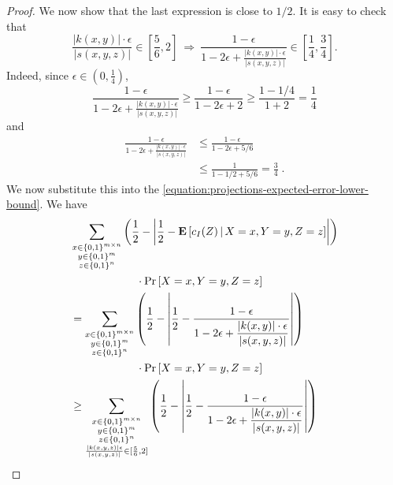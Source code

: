 \begin{proof}
We now show that the last expression is close to $1/2$. It is easy to check that
$$
\frac{|k(x,y)| \cdot \epsilon}{|s(x,y,z)|} \in \left[\frac{5}{6}, 2 \right] \ \Rightarrow \ \frac{\displaystyle 1 - \epsilon}{\displaystyle 1 - 2\epsilon + \frac{|k(x,y)| \cdot \epsilon}{|s(x,y,z)|}} \in \left[ \frac{1}{4}, \frac{3}{4} \right].
$$
Indeed, since $\epsilon \in (0,\frac{1}{4})$,
$$
\frac{\displaystyle 1 - \epsilon}{\displaystyle 1 - 2\epsilon + \frac{|k(x,y)| \cdot \epsilon}{|s(x,y,z)|}} \ge
\frac{\displaystyle 1 - \epsilon}{\displaystyle 1 - 2\epsilon + 2} \ge \frac{\displaystyle 1 - 1/4}{\displaystyle 1 + 2} = \frac{1}{4}
$$
and
\begin{align*}
\frac{\displaystyle 1 - \epsilon}{\displaystyle 1 - 2\epsilon + \frac{|k(x,y)| \cdot \epsilon}{|s(x,y,z)|}}
& \le \frac{\displaystyle 1 - \epsilon}{\displaystyle 1 - 2\epsilon + 5/6} \\
& \le \frac{\displaystyle 1}{\displaystyle 1 - 1/2 + 5/6} = \frac{3}{4} \; .
\end{align*}
We now substitute this into the \eqref{equation:projections-expected-error-lower-bound}. We have
\begin{align*}
& \sum_{\substack{x \in \{0,1\}^{m \times n} \\ y \in \{0,1\}^m \\ z \in \{0,1\}^n}} \left( \frac{1}{2} - \left| \frac{1}{2} - \Exp\left[ c_I(Z) \, \middle| \, X = x, Y = y, Z = z \right] \right| \right) \\
& \qquad \qquad \qquad  \cdot \Pr \left[X = x, Y = y, Z = z \right] \\
& = \sum_{\substack{x \in \{0,1\}^{m \times n} \\ y \in \{0,1\}^m \\ z \in \{0,1\}^n}} \left( \frac{1}{2} - \left| \frac{1}{2} - \frac{\displaystyle 1 - \epsilon}{\displaystyle 1 - 2\epsilon + \frac{|k(x,y)| \cdot \epsilon}{|s(x,y,z)|}} \right| \right) \\
& \qquad \qquad \qquad  \cdot \Pr \left[X = x, Y = y, Z = z \right] \\
& \ge
\sum_{\substack{x \in \{0,1\}^{m \times n} \\ y \in \{0,1\}^m \\ z \in \{0,1\}^n \\ \frac{|k(x,y,z)| \epsilon}{|s(x,y,z)|} \in [\frac{5}{6},2]}} \left( \frac{1}{2} - \left| \frac{1}{2} - \frac{\displaystyle 1 - \epsilon}{\displaystyle 1 - 2\epsilon + \frac{|k(x,y)| \cdot \epsilon}{|s(x,y,z)|}} \right|  \right) \\

\end{align*}
\end{proof}
